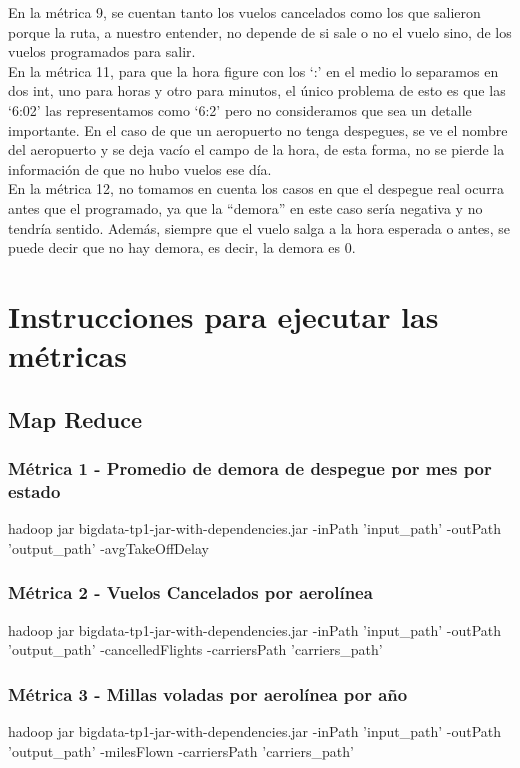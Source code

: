 \documentclass[a4paper,10pt]{article}
\begin{document}
En la métrica 9, se cuentan tanto los vuelos cancelados como los que salieron porque la ruta, a nuestro entender, no depende de si sale o no el vuelo sino, de los vuelos programados para salir. \\

En la métrica 11, para que la hora figure con los ‘:’ en el medio lo separamos en dos int, uno para horas y otro para minutos, el único problema de esto es que las ‘6:02’ las representamos como ‘6:2’ pero no consideramos que sea un detalle importante.
En el caso de que un aeropuerto no tenga despegues, se ve el nombre del aeropuerto y se deja vacío el campo de la hora, de esta forma, no se pierde la información de que no hubo vuelos ese día.\\

En la métrica 12, no tomamos en cuenta los casos en que el despegue real ocurra antes que el programado, ya que la “demora” en este caso sería negativa y no tendría sentido. Además, siempre que el vuelo salga a la hora esperada o antes, se puede decir que no hay demora, es decir, la demora es 0.



\section{Instrucciones para ejecutar las métricas}

    \subsection{Map Reduce}
        \subsubsection{Métrica 1 - Promedio de demora de despegue por mes por estado}
            \footnotesize{hadoop jar bigdata-tp1-jar-with-dependencies.jar -inPath 'input\_path' -outPath 'output\_path' -avgTakeOffDelay}
        \subsubsection{Métrica 2 - Vuelos Cancelados por aerolínea}
            \footnotesize{hadoop jar bigdata-tp1-jar-with-dependencies.jar -inPath 'input\_path' -outPath 'output\_path' -cancelledFlights -carriersPath 'carriers\_path'}
        \subsubsection{Métrica 3 - Millas voladas por aerolínea por año}
            \footnotesize{hadoop jar bigdata-tp1-jar-with-dependencies.jar -inPath 'input\_path' -outPath 'output\_path' -milesFlown -carriersPath 'carriers\_path'}
\end{document}
